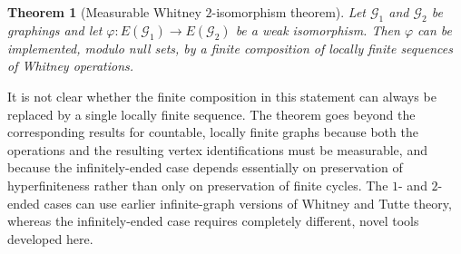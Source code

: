 \documentclass{article}
\theoremstyle{plain}
\newtheorem{thm}{Theorem}[section]
\theoremstyle{definition}
\newcommand{\cG}{\mathcal{G}}
\begin{document}
\begin{thm}[Measurable Whitney $2$-isomorphism theorem]\label{thm:Whitney_2-isom_intro}
   Let $\cG_1$ and $\cG_2$ be graphings and let $\varphi:E(\cG_1)\to E(\cG_2)$ be a weak isomorphism. Then $\varphi$ can be implemented, modulo null sets, by a finite composition of locally finite sequences of Whitney operations.
\end{thm}

It is not clear whether the finite composition in this statement can always be replaced by a single locally finite sequence. The theorem goes beyond the corresponding results for countable, locally finite graphs because both the operations and the resulting vertex identifications must be measurable, and because the infinitely-ended case depends essentially on preservation of hyperfiniteness rather than only on preservation of finite cycles. The $1$- and $2$-ended cases can use earlier infinite-graph versions of Whitney and Tutte theory, whereas the infinitely-ended case requires completely different, novel tools developed here.
\end{document}
